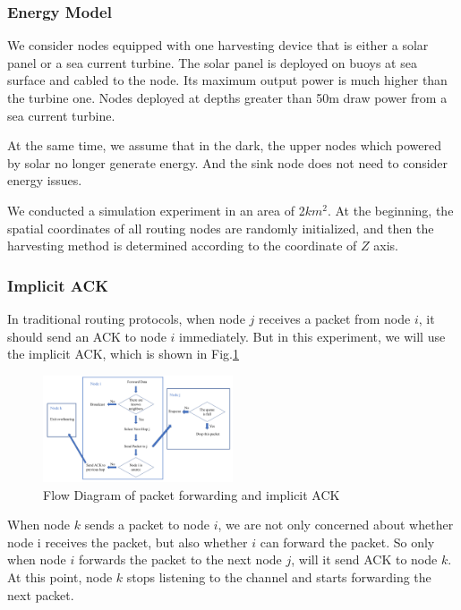 \documentclass[10pt,twocolumn,letterpaper]{article}
\begin{document}
\subsubsection{Energy Model}
	We consider nodes equipped with one harvesting device that is either a solar panel or a sea current turbine. The solar panel is deployed on buoys at sea surface and cabled to the node. Its maximum output power is much higher than the turbine one. Nodes deployed at depths greater than 50m draw power from a sea current turbine. 
	
	At the same time, we assume that in the dark, the upper nodes which powered by solar no longer generate energy. And the sink node does not need to consider energy issues.
	
	We conducted a simulation experiment in an area of 2$km^2$. At the beginning, the spatial coordinates of all routing nodes are randomly initialized, and then the harvesting method is determined according to the coordinate of $Z$ axis.
\subsubsection{Implicit ACK}
	In traditional routing protocols, when node $j$ receives a packet from node $i$, it should send an ACK to node $i$ immediately. But in this experiment, we will use the implicit ACK, which is shown in Fig.\ref{ref:ack}
	\begin{figure}[htbp]
		\centering
		\includegraphics[width=0.5\textwidth]{figure/1.pdf}
		\caption{Flow Diagram of packet forwarding and implicit ACK}
		\label{ref:ack}
	\end{figure}

	When node $k$ sends a packet to node $i$, we are not only concerned about whether node i receives the packet, but also whether $i$ can forward the packet. So only when node $i$ forwards the packet to the next node $j$, will it send ACK to node $k$. At this point, node $k$ stops listening to the channel and starts forwarding the next packet.
	
\end{document}
